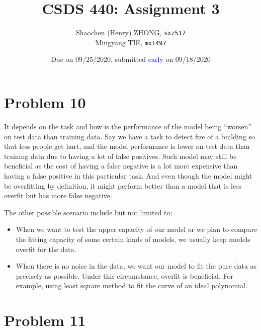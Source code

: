 \documentclass[12pt]{article}
\newcommand{\ilcode}{\texttt}
\begin{document}
\title{\textbf{CSDS 440: Assignment 3}}

\author{Shaochen (Henry) ZHONG, \ilcode{sxz517} \\ Mingyang TIE, \ilcode{mxt497}}
\date{Due on 09/25/2020, submitted \textcolor{blue}{early} on 09/18/2020}
\maketitle


\section{Problem 10}

It depends on the task and how is the performance of the model being ``worsen'' on test data than training data. Say we have a task to detect fire of a building so that less people get hurt, and the model performance is lower on test data than training data due to having a lot of false positives. Such model may still be beneficial as the cost of having a false negative is a lot more expensive than having a false positive in this particular task. And even though the model might be overfitting by definition, it might perform better than a model that is less overfit but has more false negative.

The other possible scenario include but not limited to:
\begin{itemize}
    \item When we want to test the upper capacity of our model or we plan to compare the fitting capacity of some certain kinds of models, we usually keep models overfit for the data.
    \item When there is no noise in the data, we want our model to fit the pure data as precisely as possible. Under this circumstance, overfit is beneficial. For example, using least square method to fit the curve of an ideal polynomial.
\end{itemize}

\section{Problem 11}
\end{document}

